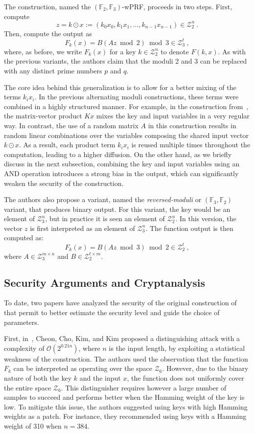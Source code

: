 \documentclass[journal=tosc,submission]{iacrtrans}
\theoremstyle{theorem}
\newcommand\Z{\mathcal{Z}}
\begin{document}
The construction, named the $(\mathbb{F}_2, \mathbb{F}_3)$-wPRF, proceeds in two steps. First, compute
\[
z = k \odot  x:= (k_0 x_0, k_1 x_1, \dots, k_{n-1} x_{n-1}) \in \Z_2^n~.
\]
Then, compute the output as
\[
F_k(x) = B(Az \bmod 2) \bmod 3 \in \Z_3^t~,
\]
where, as before, we write $F_k(x)$ for a key $k \in \Z_2^n$ to denote $F(k, x)$.
As with the previous variants, the authors claim that the moduli 2 and 3 can be replaced with any distinct prime numbers $p$ and $q$.

The core idea behind this generalization is to allow for a better mixing of the terms $k_i x_i$. In the previous alternating moduli constructions, these terms were combined in a highly structured manner. For example, in the construction from~\cite{C:DGHIKS21}, the matrix-vector product $Kx$ mixes  the key and input variables in a very regular  way. In contrast, the use of a random matrix $A$ in this construction results in random linear combinations over the variables composing the shared input vector $k \odot x$. As a result, each product term $k_i x_i$ is reused multiple times throughout the computation,  leading to a higher diffusion. On the other hand, as we briefly discuss in the next subsection, combining the key and input variables using an AND operation introduces a strong bias in the output, which can significantly weaken the security of the construction.

The authors also propose a variant, named the \emph{reversed-moduli} or $(\mathbb{F}_3, \mathbb{F}_2)$ variant,  that produces binary output. For this variant, the key would be an element of $\Z_3^n$, but in practice it is seen an element of $\Z_2^n$. In this version, the vector $z$ is first interpreted as an element of $\Z_3^n$. The function output is then computed as:
\[
F_k(x) = B(Az \bmod 3) \bmod 2 \in \Z_2^t~,
\]
where $A \in \Z_3^{m \times n}$ and $B \in \Z_2^{t \times m}$.



\subsection{Security Arguments and Cryptanalysis}
\label{sec:bipsw_cryptanalysis}

To date, two papers have analyzed the security of the original construction of~\cite{TCC:BIPSW18} that permit to better estimate the security level and guide the  choice of parameters.

First, in~\cite{PKC:CCKK21}, Cheon, Cho, Kim, and Kim proposed a distinguishing attack with a complexity of $\mathcal{O}(2^{0.21n})$, where $n$ is the input length, by exploiting a statistical weakness of the construction. The authors used the observation that the function $F_k$ can be interpreted as operating over the space $\Z_6$. However, due to the binary nature of both the key $k$ and the input $x$, the function does not uniformly cover the entire space $\Z_6$. This distinguisher requires however a large number of samples to succeed and performs better when the Hamming weight of the key is low. To mitigate this issue, the authors suggested using keys with high Hamming weights as a patch. For instance, they recommended using keys with a Hamming weight of 310 when $n = 384$.
\end{document}
